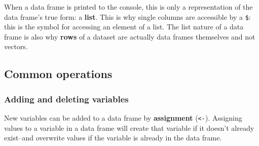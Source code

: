 \documentclass[
  13,
  letterpaper,
]{report}
\begin{document}
When a data frame is printed to the console, this is only a
representation of the data frame's true form: a \textbf{list}. This is
why single columns are accessible by a \texttt{\$}: this is the symbol
for accessing an element of a list. The list nature of a data frame is
also why \textbf{rows} of a dataset are actually data frames themselves
and not vectors.

\subsection{Common operations}\label{sec-manip-df-com}

\subsubsection{Adding and deleting
variables}\label{sec-manip-df-com-vars}

New variables can be added to a data frame by \textbf{assignment}
(\texttt{\textless{}-}). Assigning values to a variable in a data frame
will create that variable if it doesn't already exist--and overwrite
values if the variable is already in the data frame.
\end{document}
